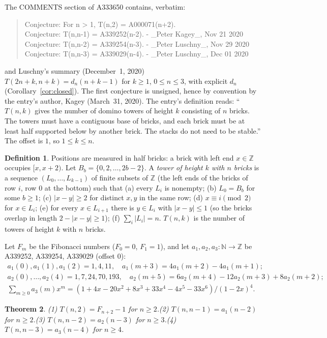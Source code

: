 \documentclass[11pt]{amsart}
\theoremstyle{plain}
\newtheorem{theorem}{Theorem}
\theoremstyle{definition}
\newtheorem{definition}[theorem]{Definition}
\newcommand{\N}{\mathbb{N}}
\newcommand{\Z}{\mathbb{Z}}
\begin{document}
The COMMENTS section of A333650 \cite{A333650} contains, verbatim:
\begin{quote}\small\ttfamily
Conjecture: For n > 1, T(n,2) = A000071(n+2).\\
Conjecture: T(n,n-1) = A339252(n-2). - \_Peter Kagey\_, Nov 21 2020\\
Conjecture: T(n,n-2) = A339254(n-3). - \_Peter Luschny\_, Nov 29 2020\\
Conjecture: T(n,n-3) = A339029(n-4). - \_Peter Luschny\_, Dec 01 2020
\end{quote}
and Luschny's summary (December~1, 2020) $T(2n+k,n+k)=d_n(n+k-1)$ for $k\ge1$, $0\le n\le3$, with explicit $d_n$ (Corollary~\ref{cor:closed}). The first conjecture is unsigned, hence by convention by the entry's author, Kagey (March~31, 2020).
The entry's definition reads: ``$T(n,k)$ gives the number of domino towers of height $k$ consisting of $n$ bricks. The towers must have a contiguous base of bricks, and each brick must be at least half supported below by another brick. The stacks do not need to be stable.'' The offset is $1$, so $1\le k\le n$.

\begin{definition}\label{def:tower}
Positions are measured in half bricks: a brick with left end $x\in\Z$ occupies $[x,x+2)$. Let $B_b=\{0,2,\dots,2b-2\}$. A \emph{tower of height $k$ with $n$ bricks} is a sequence $(L_0,\dots,L_{k-1})$ of finite subsets of $\Z$ (the left ends of the bricks of row $i$, row $0$ at the bottom) such that
(a) every $L_i$ is nonempty;
(b) $L_0=B_b$ for some $b\ge1$;
(c) $|x-y|\ge2$ for distinct $x,y$ in the same row;
(d) $x\equiv i\pmod 2$ for $x\in L_i$;
(e) for every $x\in L_{i+1}$ there is $y\in L_i$ with $|x-y|\le1$ (so the bricks overlap in length $2-|x-y|\ge1$);
(f) $\sum_i|L_i|=n$.
$T(n,k)$ is the number of towers of height $k$ with $n$ bricks.
\end{definition}
Let $F_m$ be the Fibonacci numbers ($F_0=0$, $F_1=1$), and let $a_1,a_2,a_3\colon\N\to\Z$ be A339252, A339254, A339029 (offset $0$):
\begin{gather*}
a_1(0),a_1(1),a_1(2)=1,4,11,\quad a_1(m+3)=4a_1(m+2)-4a_1(m+1);\\
a_2(0),\dots,a_2(4)=1,7,24,70,193,\quad a_2(m+5)=6a_2(m+4)-12a_2(m+3)+8a_2(m+2);\\
\textstyle\sum_{m\ge0}a_3(m)x^m=(1+4x-20x^2+8x^3+33x^4-4x^5-33x^6)/(1-2x)^4 .
\end{gather*}

\begin{theorem}\label{thm:main}
(1) $T(n,2)=F_{n+2}-1$ for $n\ge2$.\quad (2) $T(n,n-1)=a_1(n-2)$ for $n\ge2$.\quad (3) $T(n,n-2)=a_2(n-3)$ for $n\ge3$.\quad (4) $T(n,n-3)=a_3(n-4)$ for $n\ge4$.
\end{theorem}
\end{document}
